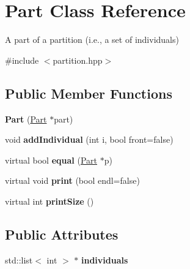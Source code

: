 \hypertarget{class_part}{}\section{Part Class Reference}
\label{class_part}


A part of a partition (i.\+e., a set of individuals)  




{\ttfamily \#include $<$partition.\+hpp$>$}

\subsection*{Public Member Functions}
\begin{DoxyCompactItemize}
\item 
\hypertarget{class_part_a4fc5eedff4d310041e3ebee54693f4ac}{}{\bfseries Part} (\hyperlink{class_part}{Part} $\ast$part)\label{class_part_a4fc5eedff4d310041e3ebee54693f4ac}

\item 
\hypertarget{class_part_aa711a575b6b5bb0080b4e9fa7e20bbe1}{}void {\bfseries add\+Individual} (int i, bool front=false)\label{class_part_aa711a575b6b5bb0080b4e9fa7e20bbe1}

\item 
\hypertarget{class_part_a8b37a2433f60fba0c5dcce393e4f5a86}{}virtual bool {\bfseries equal} (\hyperlink{class_part}{Part} $\ast$p)\label{class_part_a8b37a2433f60fba0c5dcce393e4f5a86}

\item 
\hypertarget{class_part_a2d3c13012c781d8651b820e60d57c724}{}virtual void {\bfseries print} (bool endl=false)\label{class_part_a2d3c13012c781d8651b820e60d57c724}

\item 
\hypertarget{class_part_a501f9fdbc4efd9ce00e1eef4a07f033e}{}virtual int {\bfseries print\+Size} ()\label{class_part_a501f9fdbc4efd9ce00e1eef4a07f033e}

\end{DoxyCompactItemize}
\subsection*{Public Attributes}
\begin{DoxyCompactItemize}
\item 
\hypertarget{class_part_a12f364b91efb5702af492cbdef1990fe}{}std\+::list$<$ int $>$ $\ast$ {\bfseries individuals}\label{class_part_a12f364b91efb5702af492cbdef1990fe}

\end{DoxyCompactItemize}


